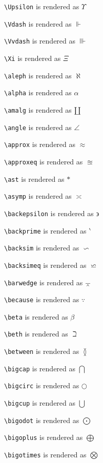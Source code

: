 \texttt{\textbackslash Upsilon} is rendered as $\Upsilon$

\texttt{\textbackslash Vdash} is rendered as $\Vdash$

\texttt{\textbackslash Vvdash} is rendered as $\Vvdash$

\texttt{\textbackslash Xi} is rendered as $\Xi$

\texttt{\textbackslash aleph} is rendered as $\aleph$

\texttt{\textbackslash alpha} is rendered as $\alpha$

\texttt{\textbackslash amalg} is rendered as $\amalg$

\texttt{\textbackslash angle} is rendered as $\angle$

\texttt{\textbackslash approx} is rendered as $\approx$

\texttt{\textbackslash approxeq} is rendered as $\approxeq$

\texttt{\textbackslash ast} is rendered as $\ast$

\texttt{\textbackslash asymp} is rendered as $\asymp$

\texttt{\textbackslash backepsilon} is rendered as $\backepsilon$

\texttt{\textbackslash backprime} is rendered as $\backprime$

\texttt{\textbackslash backsim} is rendered as $\backsim$

\texttt{\textbackslash backsimeq} is rendered as $\backsimeq$

\texttt{\textbackslash barwedge} is rendered as $\barwedge$

\texttt{\textbackslash because} is rendered as $\because$

\texttt{\textbackslash beta} is rendered as $\beta$

\texttt{\textbackslash beth} is rendered as $\beth$

\texttt{\textbackslash between} is rendered as $\between$

\texttt{\textbackslash bigcap} is rendered as $\bigcap$

\texttt{\textbackslash bigcirc} is rendered as $\bigcirc$

\texttt{\textbackslash bigcup} is rendered as $\bigcup$

\texttt{\textbackslash bigodot} is rendered as $\bigodot$

\texttt{\textbackslash bigoplus} is rendered as $\bigoplus$

\texttt{\textbackslash bigotimes} is rendered as $\bigotimes$

